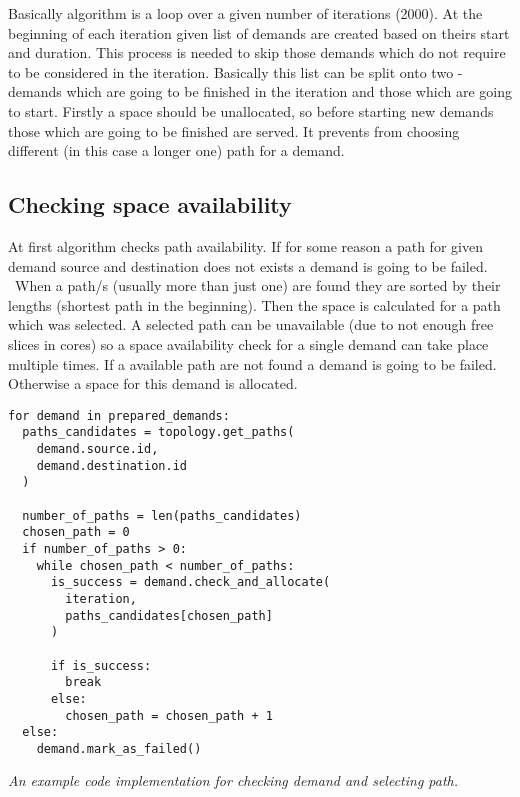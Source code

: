 \documentclass[conference]{IEEEtran}
\begin{document}
Basically algorithm is a loop over a given number of iterations (2000). At the beginning of each iteration given list of demands are created based on theirs start and duration. This process is needed to skip those demands which do not require to be considered in the iteration. Basically this list can be split onto two - demands which are going to be finished in the iteration and those which are going to start. Firstly a space should be unallocated, so before starting new demands those which are going to be finished are served. It prevents from choosing different (in this case a longer one) path for a demand.

\subsection{Checking space availability}
At first algorithm checks path availability. If for some reason a path for given demand source and destination does not exists a demand is going to be failed. \ 
When a path/s (usually more than just one) are found they are sorted by their lengths (shortest path in the beginning). Then the space is calculated for a path which was selected. A selected path can be unavailable (due to not enough free slices in cores) so a space availability check for a single demand can take place multiple times. If a available path are not found a demand is going to be failed. Otherwise a space for this demand is allocated. \

\begin{small}
\begin{lstlisting}[frame=single]
for demand in prepared_demands:
  paths_candidates = topology.get_paths(
    demand.source.id,
    demand.destination.id
  )
    
  number_of_paths = len(paths_candidates)
  chosen_path = 0
  if number_of_paths > 0:
    while chosen_path < number_of_paths:
      is_success = demand.check_and_allocate(
        iteration,
        paths_candidates[chosen_path]
      )

      if is_success:
        break
      else:
        chosen_path = chosen_path + 1
  else:
    demand.mark_as_failed()
\end{lstlisting}
\textit{An example code implementation for checking demand and selecting path.}
\end{small}
\\
\end{document}

